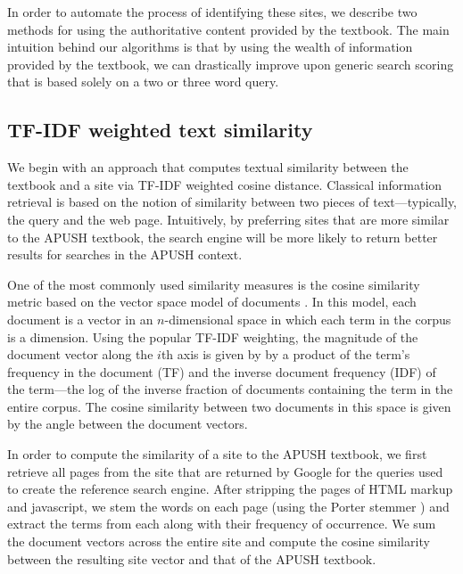 \documentclass[pdfpagelabels=false,plainpages=true]{acm_proc_article-sp}
\begin{document}
In order to automate the process of identifying these sites, we describe two
methods for using the authoritative content provided by the textbook. The main
intuition behind our algorithms is that by using the wealth of information
provided by the textbook, we can drastically improve upon generic search scoring
that is based solely on a two or three word query. 



\subsection{TF-IDF weighted text similarity}

We begin with an
approach that computes textual similarity between the textbook and a site via
TF-IDF weighted cosine distance. Classical 
information retrieval is based on the notion of similarity between two 
pieces of text---typically, the query and the web page.  Intuitively, by
preferring sites that are more similar to the APUSH textbook, the search engine
will be more likely to return better results for searches in the APUSH context.  

One of the most commonly used similarity measures is the cosine similarity
metric based on the vector space model of documents \cite{salton1975vector}. In
this model, each document is a vector in an $n$-dimensional space in which each
term in the corpus is a dimension. Using the popular TF-IDF weighting, the
magnitude of the document vector along the $i$th axis is given by by a product
of the term's frequency in the document (TF) and the inverse document frequency
(IDF) of the term---the log of the inverse fraction of documents containing the term in the
entire corpus. The cosine similarity between two documents in this space is
given by the angle between the document vectors.

In order to compute the similarity of a site to the APUSH textbook, we first
retrieve all pages from the site that are returned by Google for the queries
used to create the reference search engine. After stripping the pages of HTML
markup and javascript, we stem the words on each page (using the Porter stemmer 
\cite{porter1980algorithm}) and extract the terms from each along with their
frequency of occurrence. We sum the document vectors across the entire site and
compute the cosine similarity between the resulting site vector and that of
the APUSH textbook.
\end{document}
